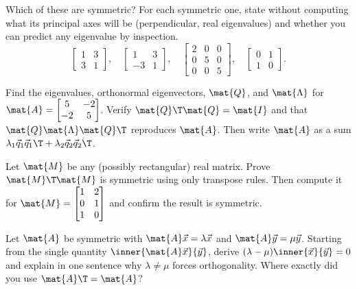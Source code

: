 \begin{exercise}
\label{ch26:ex-spot}
Which of these are symmetric? For each symmetric one, state without computing what
its principal axes will be (perpendicular, real eigenvalues) and whether you can
predict any eigenvalue by inspection.
\[
  \begin{bmatrix}1&3\\3&1\end{bmatrix},\quad
  \begin{bmatrix}1&3\\-3&1\end{bmatrix},\quad
  \begin{bmatrix}2&0&0\\0&5&0\\0&0&5\end{bmatrix},\quad
  \begin{bmatrix}0&1\\1&0\end{bmatrix}.
\]
\end{exercise}

\begin{exercise}
\label{ch26:ex-byhand}
Find the eigenvalues, orthonormal eigenvectors, $\mat{Q}$, and $\mat{\Lambda}$ for
$\mat{A}=\begin{bmatrix}5&-2\\-2&5\end{bmatrix}$. Verify $\mat{Q}\T\mat{Q}=\mat{I}$
and that $\mat{Q}\mat{\Lambda}\mat{Q}\T$ reproduces $\mat{A}$. Then write $\mat{A}$
as a sum $\lambda_1\vec{q}_1\vec{q}_1\T + \lambda_2\vec{q}_2\vec{q}_2\T$.
\end{exercise}

\begin{exercise}
\label{ch26:ex-gram}
Let $\mat{M}$ be any (possibly rectangular) real matrix. Prove
$\mat{M}\T\mat{M}$ is symmetric using only transpose rules. Then compute it for
$\mat{M}=\begin{bmatrix}1&2\\0&1\\1&0\end{bmatrix}$ and confirm the result is
symmetric.
\end{exercise}

\begin{exercise}
\label{ch26:ex-ortho-proof}
Let $\mat{A}$ be symmetric with $\mat{A}\vec{x}=\lambda\vec{x}$ and
$\mat{A}\vec{y}=\mu\vec{y}$. Starting from the single quantity
$\inner{\mat{A}\vec{x}}{\vec{y}}$, derive $(\lambda-\mu)\inner{\vec{x}}{\vec{y}}=0$
and explain in one sentence why $\lambda\neq\mu$ forces orthogonality. Where
exactly did you use $\mat{A}\T=\mat{A}$?
\end{exercise}


